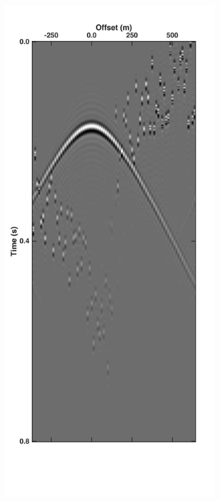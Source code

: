 \begin{figure}
\begin{subfigure}[t]{0.25\textwidth}
		\caption{}
		\label{fig:Ch-Theory-Noise}
	\end{subfigure}
	\begin{subfigure}[t]{0.25\textwidth}
		\includegraphics[width=\textwidth]{Plots/Mahdad/5iter/DeblendedCRG_rec30}	

\end{subfigure}
\end{figure}
